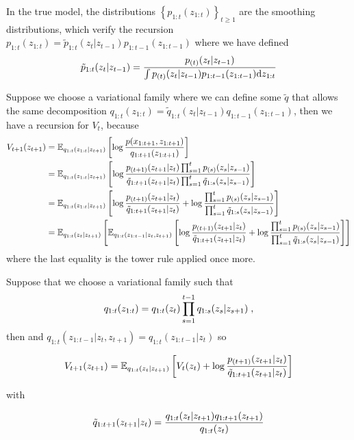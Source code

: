 \documentclass{article}
\begin{document}
In the true model, the distributions $\left\{p_{1:t}(z_{1:t})\right\}_{t \geq 1}$ are the smoothing distributions, which verify the recursion $p_{1:t}(z_{1:t}) = \tilde{p}_{1:t}(z_t|z_{t-1}) p_{1:t-1}(z_{1:t-1})$ where we have defined $$\tilde{p}_{1:t}(z_t|z_{t-1}) = \frac{p_{(t)}(z_{t}|z_{t-1})}{\int p_{(t)}(z_{t}|z_{t-1})p_{1:t-1}(z_{1:t-1})\mathrm{d} z_{1:t}}$$

Suppose we choose a variational family where we can define some $\tilde{q}$ that allows the same decomposition $q_{1:t}(z_{1:t}) = \tilde{q}_{1:t}(z_t|z_{t-1}) q_{1:t-1}(z_{1:t-1})$, then we have a recursion for $V_t$, because
\begin{align*}
V_{t+1}(z_{t+1}) &= \mathbb{E}_{q_{1:t}(z_{1:t}|z_{t+1})}\left[\log \frac{p(x_{1:t+1},z_{1:t+1})}{q_{1:t+1}(z_{1:t+1})}\right] \\
                   &= \mathbb{E}_{q_{1:t}(z_{1:t}|z_{t+1})}\left[\log\frac{p_{(t+1)}(z_{t+1}|z_t)\prod_{s=1}^t p_{(s)}(z_s|z_{s-1})}{\tilde{q}_{1:t+1}(z_{t+1}|z_t)\prod_{s=1}^t \tilde{q}_{1:s}(z_s|z_{s-1})}\right]\\
                   &= \mathbb{E}_{q_{1:t}(z_{1:t}|z_{t+1})}\left[\log\frac{p_{(t+1)}(z_{t+1}|z_t)}{\tilde{q}_{1:t+1}(z_{t+1}|z_t)} + \log\frac{\prod_{s=1}^t p_{(s)}(z_s|z_{s-1})}{\prod_{s=1}^t \tilde{q}_{1:s}(z_s|z_{s-1})}\right] \\
                   &= \mathbb{E}_{q_{1:t}( z_t|z_{t+1})}\left[\mathbb{E}_{q_{1:t}(z_{1:t-1}|z_t,z_{t+1})}\left[
                           \log\frac{p_{(t+1)}(z_{t+1}|z_t)}{\tilde{q}_{1:t+1}(z_{t+1}|z_t)} + \log\frac{\prod_{s=1}^t p_{(s)}(z_s|z_{s-1})}{\prod_{s=1}^t \tilde{q}_{1:s}(z_s|z_{s-1})}\right]\right]
\end{align*}
where the last equality is the tower rule applied once more. 

Suppose that we choose a variational family such that 
\begin{equation}\label{backward_fact}
    q_{1:t}(z_{1:t}) = q_{1:t}(z_{t})\prod_{s=1}^{t-1} q_{1:s}(z_s|z_{s+1})\;,
\end{equation}
then and $q_{1:t}(z_{1:t-1}|z_t, z_{t+1}) = q_{1:t}(z_{1:t-1}|z_t)$ so

\begin{equation}\label{v_t_recursion}
    V_{t+1}(z_{t+1}) = \mathbb{E}_{q_{1:t}(z_{t}|z_{t + 1})}\left[V_t(z_t) + \log\frac{p_{(t+1)}(z_{t+1}|z_t)}{\tilde{q}_{1:t+1}(z_{t+1}|z_t)}\right]
\end{equation}

with 

\begin{equation}
    \tilde{q}_{1:t+1}(z_{t+1}|z_t) = \frac{q_{1:t}(z_{t}|z_{t + 1})q_{1:t+1}(z_{t+1})}{q_{1:t}(z_{t})}
\end{equation}
\end{document}
